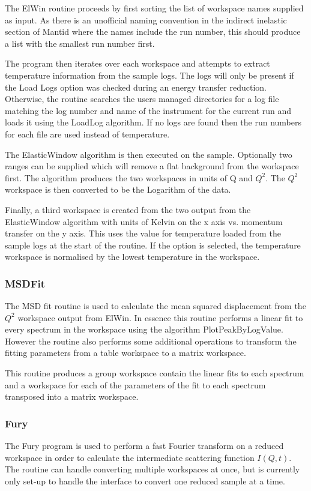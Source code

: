 \documentclass[paper=a4, fontsize=11pt]{scrartcl}	%
\numberwithin{equation}{section}															%
\numberwithin{figure}{section}																%
\numberwithin{table}{section}																%
\begin{document}
The ElWin routine proceeds by first sorting the list of workspace names supplied as input. As there is an unofficial naming convention in the indirect inelastic section of Mantid where the names include the run number, this should produce a list with the smallest run number first.

The program then iterates over each workspace and attempts to extract temperature information from the sample logs. The logs will only be present if the Load Logs option was checked during an energy transfer reduction. Otherwise, the routine searches the users managed directories for a log file matching the log number and name of the instrument for the current run and loads it using the LoadLog algorithm. If no logs are found then the run numbers for each file are used instead of temperature.

The ElasticWindow algorithm is then executed on the sample. Optionally two ranges can be supplied which will remove a flat background from the workspace first. The algorithm produces the two workspaces in units of Q and $Q^2$. The $Q^2$ workspace is then converted to be the Logarithm of the data.

Finally, a third workspace is created from the two output from the ElasticWindow algorithm with units of Kelvin on the x axis vs. momentum transfer on the y axis. This uses the value for temperature loaded from the sample logs at the start of the routine. If the option is selected, the temperature workspace is normalised by the lowest temperature in the workspace.

\subsubsection{MSDFit}
\label{subsubsec:msdfit}
The MSD fit routine is used to calculate the mean squared displacement from the $Q^2$ workspace output from ElWin. In essence this routine performs a linear fit to every spectrum in the workspace using the algorithm PlotPeakByLogValue. However the routine also performs some additional operations to transform the fitting parameters from a table workspace to a matrix workspace.

This routine produces a group workspace contain the linear fits to each spectrum and a workspace for each of the parameters of the fit to each spectrum transposed into a matrix workspace.

\subsubsection{Fury}
The Fury program is used to perform a fast Fourier transform on a reduced workspace in order to calculate the intermediate scattering function $I(Q,t)$. The routine can handle converting multiple workspaces at once, but is currently only set-up to handle the interface to convert one reduced sample at a time.
\end{document}
